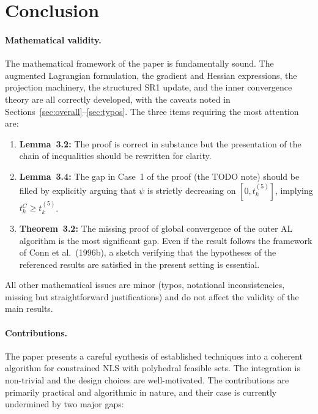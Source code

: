 \documentclass[11pt]{article}
\theoremstyle{plain}
\begin{document}
\section{Conclusion}

\paragraph{Mathematical validity.} The mathematical framework of the paper is fundamentally sound. The augmented Lagrangian formulation, the gradient and Hessian expressions, the projection machinery, the structured SR1 update, and the inner convergence theory are all correctly developed, with the caveats noted in Sections~\ref{sec:overall}--\ref{sec:typos}. The three items requiring the most attention are:

\begin{enumerate}[label=(\roman*)]
  \item \textbf{Lemma~3.2:} The proof is correct in substance but the presentation of the chain of inequalities should be rewritten for clarity.
  \item \textbf{Lemma~3.4:} The gap in Case~1 of the proof (the TODO note) should be filled by explicitly arguing that $\psi$ is strictly decreasing on $[0, t_k^{(5)}]$, implying $t_k^C \ge t_k^{(5)}$.
  \item \textbf{Theorem~3.2:} The missing proof of global convergence of the outer AL algorithm is the most significant gap. Even if the result follows the framework of Conn et al.\ (1996b), a sketch verifying that the hypotheses of the referenced results are satisfied in the present setting is essential.
\end{enumerate}

All other mathematical issues are minor (typos, notational inconsistencies, missing but straightforward justifications) and do not affect the validity of the main results.

\paragraph{Contributions.} The paper presents a careful synthesis of established techniques into a coherent algorithm for constrained NLS with polyhedral feasible sets. The integration is non-trivial and the design choices are well-motivated. The contributions are primarily practical and algorithmic in nature, and their case is currently undermined by two major gaps:
\end{document}
